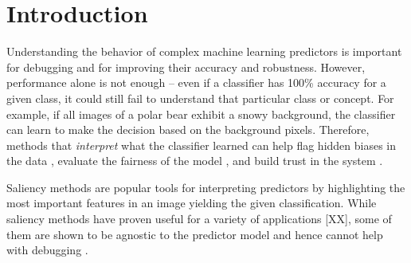 \documentclass{article}
\begin{document}

\begin{abstract}
 
\end{abstract}

\section{Introduction}

Understanding the behavior of complex machine learning predictors is important for debugging and for improving their accuracy and robustness. However, performance alone is not enough -- even if a classifier has 100\% accuracy for a given class, it could still fail to understand that particular class or concept. For example, if all images of a polar bear exhibit a snowy background, the classifier can learn to make the decision based on the background pixels. Therefore, methods that \emph{interpret} what the classifier learned can help flag hidden biases in the data \cite{buolamwini2018gender}, evaluate the fairness of the model \cite{doshi2017towards}, and build trust in the system \cite{danks2019value}. 

Saliency methods \cite{simonyan2013deep,springenberg2014striving,selvaraju2016grad,smilkov2017smoothgrad} are popular tools for interpreting predictors by highlighting the most important features in an image yielding the given classification. While saliency methods have proven useful for a variety of applications [XX], some of them are shown to be agnostic to the predictor model and hence cannot help with debugging \cite{adebayo2018sanity}. 
\end{document}
